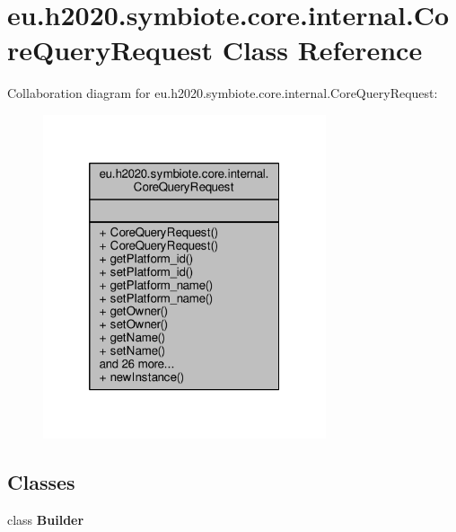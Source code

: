 \hypertarget{classeu_1_1h2020_1_1symbiote_1_1core_1_1internal_1_1CoreQueryRequest}{}\section{eu.\+h2020.\+symbiote.\+core.\+internal.\+Core\+Query\+Request Class Reference}
\label{classeu_1_1h2020_1_1symbiote_1_1core_1_1internal_1_1CoreQueryRequest}


Collaboration diagram for eu.\+h2020.\+symbiote.\+core.\+internal.\+Core\+Query\+Request\+:\nopagebreak
\begin{figure}[H]
\begin{center}
\leavevmode
\includegraphics[width=236pt]{classeu_1_1h2020_1_1symbiote_1_1core_1_1internal_1_1CoreQueryRequest__coll__graph}
\end{center}
\end{figure}
\subsection*{Classes}
\begin{DoxyCompactItemize}
\item 
class {\bfseries Builder}
\end{DoxyCompactItemize}
